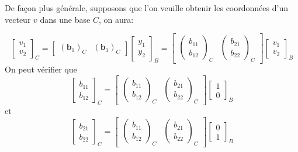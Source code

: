 \documentclass{article}
\begin{document}
De façon plus générale, supposons que l'on veuille obtenir les coordonnées d'un vecteur $v$ dans une base $C$, on aura:

\[
\begin{bmatrix}
v_1 \\ v_2
\end{bmatrix}_C
=
\begin{bmatrix}
(\mathbf{b}_1)_C
&
(\mathbf{b}_1)_C
\end{bmatrix}
\begin{bmatrix}
y_1 \\ y_2
\end{bmatrix}_B
=
\begin{bmatrix}
\begin{pmatrix}
b_{11} \\
b_{12}
\end{pmatrix}_C
&
\begin{pmatrix}
b_{21} \\
b_{22}
\end{pmatrix}_C
\end{bmatrix}
\begin{bmatrix}
v_1 \\ v_2
\end{bmatrix}_B
\]
On peut vérifier que
\[
\begin{bmatrix}
b_{11} \\ b_{12}
\end{bmatrix}_C
=
\begin{bmatrix}
\begin{pmatrix}
b_{11} \\
b_{12}
\end{pmatrix}_C
&
\begin{pmatrix}
b_{21} \\
b_{22}
\end{pmatrix}_C
\end{bmatrix}
\begin{bmatrix}
1 \\ 0
\end{bmatrix}_B
\]
et
\[
\begin{bmatrix}
b_{21} \\ b_{22}
\end{bmatrix}_C
=
\begin{bmatrix}
\begin{pmatrix}
b_{11} \\
b_{12}
\end{pmatrix}_C
&
\begin{pmatrix}
b_{21} \\
b_{22}
\end{pmatrix}_C
\end{bmatrix}
\begin{bmatrix}
0 \\ 1
\end{bmatrix}_B
\]
\end{document}
